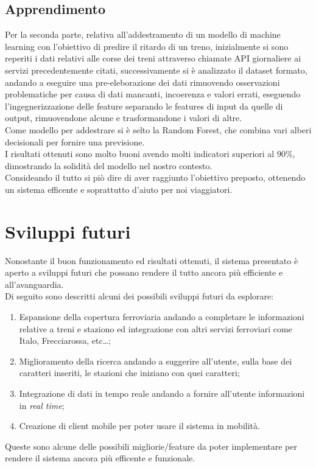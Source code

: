 \documentclass[italian,12pt,a4paper]{article}
\begin{document}
	\subsection{Apprendimento}
	Per la seconda parte, relativa all'addestramento di un modello di machine learning con l'obiettivo di predire il ritardo di un treno, inizialmente si sono reperiti i dati relativi alle corse dei treni attraverso chiamate API giornaliere ai servizi precedentemente citati, successivamente si è analizzato il dataset formato, andando a eseguire una pre-eleborazione dei dati rimuovendo osservazioni problematiche per causa di dati mancanti, incoerenza e valori errati, eseguendo l'ingegnerizzazione delle feature separando le features di input da quelle di output, rimuovendone alcune e trasformandone i valori di altre.\\
	Come modello per addestrare si è selto la Random Forest, che combina vari alberi decisionali per fornire una previsione. \\
	I risultati ottenuti sono molto buoni avendo molti indicatori superiori al $90\%$, dimostrando la solidità del modello nel nostro contesto. \\
	\linebreak
	Consideando il tutto si piò dire di aver raggiunto l'obiettivo preposto, ottenendo un sistema efficente e soprattutto d'aiuto per noi viaggiatori.

	
	\section{Sviluppi futuri}
	Nonostante il buon funzionamento ed risultati ottenuti, il sistema presentato è aperto a sviluppi futuri che possano rendere il tutto ancora più efficiente e all'avanguardia. \\
	\linebreak
	Di seguito sono descritti alcuni dei possibili sviluppi futuri da esplorare:
	
	\begin{enumerate}
		\item Espansione della copertura ferroviaria andando a completare le informazioni relative a treni e staziono ed integrazione con altri servizi ferroviari come Italo, Frecciarossa, etc\dots;
		\item Miglioramento della ricerca andando a suggerire all'utente, sulla base dei caratteri inseriti, le stazioni che iniziano con quei caratteri;
		\item Integrazione di dati in tempo reale andando a fornire all'utente informazioni in \textit{real time};
		\item Creazione di client mobile per poter usare il sistema in mobilità.
	\end{enumerate}
	Queste sono alcune delle possibili migliorie/feature da poter implementare per rendere il sistema ancora più efficente e funzionale.
	\printbibliography
	
\end{document}
